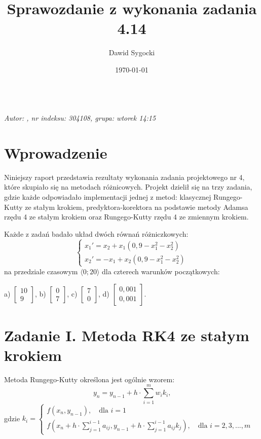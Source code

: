 \documentclass[12pt]{article}
\title{Sprawozdanie z wykonania zadania 4.14}
\author{Dawid Sygocki}
\date{\today}
\begin{document}
\makeatletter
{\huge \@title} \\
\textsl{\large Autor: \@author, nr indeksu: 304108, grupa: wtorek 14:15}
\makeatother

\section{Wprowadzenie}
Niniejszy raport przedstawia rezultaty wykonania zadania projektowego nr 4, które skupiało się na metodach różnicowych. Projekt dzielił się na trzy zadania, gdzie każde odpowiadało implementacji jednej z metod: klasycznej Rungego-Kutty ze stałym krokiem, predyktora-korektora na podstawie metody Adamsa rzędu 4 ze stałym krokiem oraz Rungego-Kutty rzędu 4 ze zmiennym krokiem.

Każde z zadań badało układ dwóch równań różniczkowych:
\[
\begin{cases}
x_1' = x_2 + x_1 (0,9 - x_1^2 - x_2^2) \\
x_2' = -x_1 + x_2 (0,9 - x_1^2 - x_2^2)
\end{cases}
\]
na przedziale czasowym \( \langle0; 20\rangle \) dla czterech warunków początkowych:
\begin{center}
a) \( \begin{bmatrix} 10 \\ 9 \end{bmatrix} \),
b) \( \begin{bmatrix} 0 \\ 7 \end{bmatrix} \),
c) \( \begin{bmatrix} 7 \\ 0 \end{bmatrix} \),
d) \( \begin{bmatrix} 0,001 \\ 0,001 \end{bmatrix} \).
\end{center}

\section{Zadanie \textrm{I}. Metoda RK4 ze stałym krokiem}
Metoda Rungego-Kutty określona jest ogólnie wzorem:
\[ y_n = y_{n-1} + h \cdot \sum_{i=1}^m w_i k_i \text{,} \]
gdzie 
\(
k_i =
\begin{cases}
f(x_n, y_{n-1}), \quad \text{dla } i=1 \\
f(x_n + h\cdot\sum_{j=1}^{i-1} a_{ij}, y_{n-1} + h\cdot\sum_{j=1}^{i-1} a_{ij} k_j), \quad \text{dla } i=2,3,...,m
\end{cases}
\)
\end{document}
